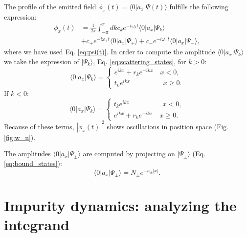 \documentclass[aps,pra,twocolumn,floatfix,superscriptaddress]{revtex4-1}%
\begin{document}
The profile of the emitted field $\phi_x(t)=\langle 0|a_x|\Psi(t)\rangle$ fulfills the following expression:
\begin{align}
\phi_x(t)& = \frac{1}{2\pi}\int_{-\pi}^\pi dk c_k e^{-i\omega_k t}\langle 0|a_x|\Psi_k\rangle \\
& + c_+ e^{-i\omega_+ t} \langle 0|a_x|\Psi_+\rangle+ c_- e^{-i\omega_- t} \langle 0|a_x|\Psi_-\rangle, \nonumber
\end{align}
where we have used Eq. \eqref{eq:psi(t)}. In order to compute the amplitude $\langle 0|a_x|\Psi_k\rangle$ we take the expression of $|\Psi_k\rangle$, Eq. \eqref{eq:scattering_states}, for $k>0$:
\begin{equation}
\langle 0|a_x|\Psi_k\rangle = \left\{ 
\begin{array}{c}
e^{ikx}+r_ke^{-ikx}\quad x<0,\\
t_k e^{ikx} \qquad\qquad\;\;\; x\geq 0.
\end{array}
\right.
\end{equation}
If $k<0$:
\begin{equation}
\langle 0|a_x|\Psi_k\rangle = \left\{ 
\begin{array}{c}
t_k e^{ikx} \qquad\qquad\;\;\; x< 0,\\
e^{ikx}+r_ke^{-ikx}\quad x\geq 0.
\end{array}
\right.
\end{equation}
Because of these terms, $|\phi_x(t)|^2$ shows oscillations in position space (Fig. \ref{fig:w_n}).

The amplitudes $\langle 0|a_x|\Psi_\pm\rangle$ are computed by projecting on $|\Psi_\pm\rangle$ (Eq. \eqref{eq:bound_states}):
\begin{equation}
\langle 0|a_x|\Psi_\pm \rangle= N_\pm e^{-\kappa_\pm |x|}.
\end{equation}



\section{Impurity dynamics: analyzing the integrand}\label{app:integrand}
\end{document}
